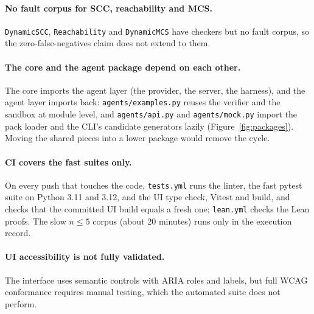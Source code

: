 \paragraph{No fault corpus for SCC, reachability and MCS.}
\texttt{DynamicSCC}, \texttt{Reachability} and \texttt{DynamicMCS} have checkers
but no fault corpus, so the zero-false-negatives claim does not extend to them.

\paragraph{The core and the agent package depend on each other.}
The core imports the agent layer (the provider, the server, the harness), and the
agent layer imports back: \texttt{agents/examples.py} reuses the verifier and the
sandbox at module level, and \texttt{agents/api.py} and \texttt{agents/mock.py}
import the pack loader and the CLI's candidate generators lazily
(Figure~\ref{fig:packages}). Moving the shared pieces into a lower package would
remove the cycle.

\paragraph{CI covers the fast suites only.} On every push that touches the
code, \texttt{tests.yml} runs the linter, the fast pytest suite on Python 3.11
and 3.12, and the UI type check, Vitest and build, and checks that the committed
UI build equals a fresh one; \texttt{lean.yml} checks the Lean proofs. The slow
$n \le 5$ corpus (about 20 minutes) runs only in the execution record.

\paragraph{UI accessibility is not fully validated.} The interface uses semantic
controls with ARIA roles and labels, but full WCAG conformance requires manual
testing, which the automated suite does not perform.

